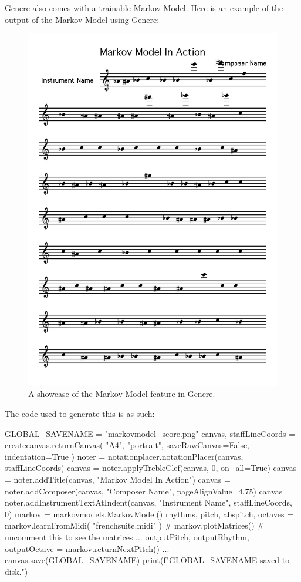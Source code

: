 \documentclass{article}
\begin{document}
\newpage
Genere also comes with a trainable Markov Model. Here is an example of the output of the Markov Model using Genere:
\begin{figure}[h]
	\centering
	\includegraphics[width=0.8\columnwidth]{images/markovmodel_score.png}
	\caption{A showcase of the Markov Model feature in Genere.}
\end{figure}
\newpage
The code used to generate this is as such:
\begin{ffcode}
	GLOBAL_SAVENAME = "markovmodel_score.png"
	canvas, staffLineCoords = createcanvas.returnCanvas(
	"A4", "portrait", saveRawCanvas=False, indentation=True
	)
	noter = notationplacer.notationPlacer(canvas, staffLineCoords)
	canvas = noter.applyTrebleClef(canvas, 0, on_all=True)
	canvas = noter.addTitle(canvas, "Markov Model In Action")
	canvas = noter.addComposer(canvas, "Composer Name", pageAlignValue=4.75)
	canvas = noter.addInstrumentTextAtIndent(canvas, "Instrument Name", staffLineCoords, 0)
	markov = markovmodels.MarkovModel()
	rhythms, pitch, abspitch, octaves = markov.learnFromMidi(
	"frenchsuite.midi"
	)
	# markov.plotMatrices()  # uncomment this to see the matrices
	...
	outputPitch, outputRhythm, outputOctave = markov.returnNextPitch()
	...
	canvas.save(GLOBAL_SAVENAME)
	print(f"{GLOBAL_SAVENAME} saved to disk.")
\end{ffcode}
\end{document}

